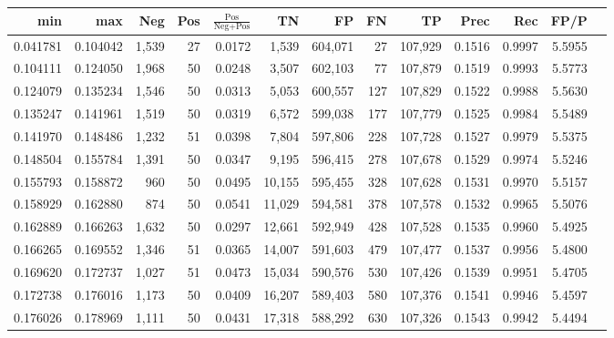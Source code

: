 \begin{tabular}{rrrrrrrrrrrrr}
\toprule
     min &      max &   Neg & Pos & $\frac{\text{Pos}}{\text{Neg}+\text{Pos}}$ &      TN &      FP &      FN &      TP &   Prec &    Rec &   FP/P \\
\midrule
0.041781 & 0.104042 & 1,539 &  27 &                                     0.0172 &   1,539 & 604,071 &      27 & 107,929 & 0.1516 & 0.9997 & 5.5955 \\
0.104111 & 0.124050 & 1,968 &  50 &                                     0.0248 &   3,507 & 602,103 &      77 & 107,879 & 0.1519 & 0.9993 & 5.5773 \\
0.124079 & 0.135234 & 1,546 &  50 &                                     0.0313 &   5,053 & 600,557 &     127 & 107,829 & 0.1522 & 0.9988 & 5.5630 \\
0.135247 & 0.141961 & 1,519 &  50 &                                     0.0319 &   6,572 & 599,038 &     177 & 107,779 & 0.1525 & 0.9984 & 5.5489 \\
0.141970 & 0.148486 & 1,232 &  51 &                                     0.0398 &   7,804 & 597,806 &     228 & 107,728 & 0.1527 & 0.9979 & 5.5375 \\
0.148504 & 0.155784 & 1,391 &  50 &                                     0.0347 &   9,195 & 596,415 &     278 & 107,678 & 0.1529 & 0.9974 & 5.5246 \\
0.155793 & 0.158872 &   960 &  50 &                                     0.0495 &  10,155 & 595,455 &     328 & 107,628 & 0.1531 & 0.9970 & 5.5157 \\
0.158929 & 0.162880 &   874 &  50 &                                     0.0541 &  11,029 & 594,581 &     378 & 107,578 & 0.1532 & 0.9965 & 5.5076 \\
0.162889 & 0.166263 & 1,632 &  50 &                                     0.0297 &  12,661 & 592,949 &     428 & 107,528 & 0.1535 & 0.9960 & 5.4925 \\
0.166265 & 0.169552 & 1,346 &  51 &                                     0.0365 &  14,007 & 591,603 &     479 & 107,477 & 0.1537 & 0.9956 & 5.4800 \\
0.169620 & 0.172737 & 1,027 &  51 &                                     0.0473 &  15,034 & 590,576 &     530 & 107,426 & 0.1539 & 0.9951 & 5.4705 \\
0.172738 & 0.176016 & 1,173 &  50 &                                     0.0409 &  16,207 & 589,403 &     580 & 107,376 & 0.1541 & 0.9946 & 5.4597 \\
0.176026 & 0.178969 & 1,111 &  50 &                                     0.0431 &  17,318 & 588,292 &     630 & 107,326 & 0.1543 & 0.9942 & 5.4494 \\

\end{tabular}
